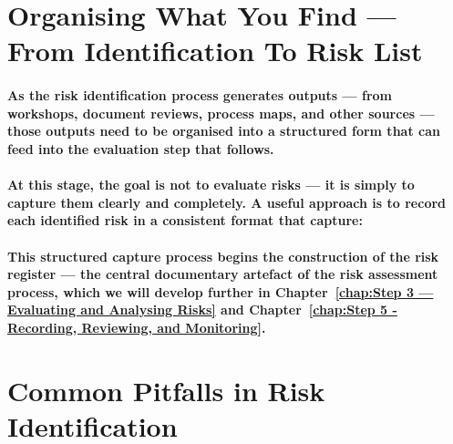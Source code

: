 \section{Organising What You Find — From Identification To Risk List}
\paragraph{As the risk identification process generates outputs — from workshops, document reviews, process maps, and other sources — those outputs need to be organised into a structured form that can feed into the evaluation step that follows.}
\paragraph{At this stage, the goal is not to evaluate risks — it is simply to capture them clearly and completely. A useful approach is to record each identified risk in a consistent format that capture:}
\begin{itemize}
\end{itemize}
\paragraph{This structured capture process begins the construction of the risk register — the central documentary artefact of the risk assessment process, which we will develop further in Chapter~\ref{chap:Step 3 — Evaluating and Analysing Risks} and Chapter~\ref{chap:Step 5 - Recording, Reviewing, and Monitoring}.}

\section{Common Pitfalls in Risk Identification}
